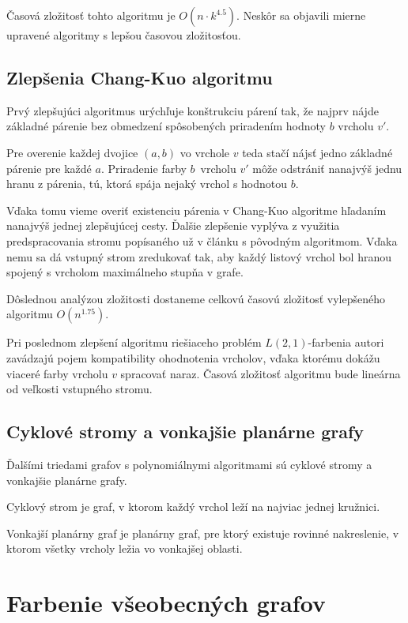 Časová zložitosť tohto algoritmu je $O(n \cdot k^{4.5})$\cite{chang_kuo}. Neskôr sa objavili
mierne upravené algoritmy s lepšou časovou zložitosťou.

\subsection{Zlepšenia Chang-Kuo algoritmu}

Prvý zlepšujúci algoritmus urýchľuje konštrukciu
párení tak, že najprv nájde základné párenie bez obmedzení spôsobených priradením hodnoty $b$
vrcholu $v'$.

Pre overenie každej dvojice $(a,b)$ vo vrchole $v$ teda stačí nájsť jedno základné
párenie pre každé $a$. Priradenie farby $b$ vrcholu $v'$ môže odstrániť nanajvýš jednu hranu z párenia,
tú, ktorá spája nejaký vrchol s hodnotou $b$. 

Vďaka tomu vieme overiť existenciu párenia v Chang-Kuo algoritme hľadaním nanajvýš
jednej zlepšujúcej cesty. Ďalšie zlepšenie vyplýva z využitia predspracovania stromu popísaného
už v článku s pôvodným algoritmom. Vďaka nemu sa dá vstupný strom zredukovať tak, aby každý
listový vrchol bol hranou spojený s vrcholom maximálneho stupňa v grafe\cite{chang_kuo}.

Dôslednou analýzou 
zložitosti dostaneme celkovú časovú zložitosť vylepšeného algoritmu $O(n^{1.75})$\cite{chang_kuo_improv}.

Pri poslednom zlepšení algoritmu riešiaceho problém $L(2,1)$-farbenia autori zavádzajú
pojem kompatibility ohodnotenia vrcholov, vďaka ktorému dokážu viaceré farby vrcholu $v$
spracovať naraz. Časová zložitosť algoritmu bude lineárna od veľkosti vstupného stromu\cite{chang_kuo_linear}.

\subsection{Cyklové stromy a vonkajšie planárne grafy}

Ďalšími triedami grafov s polynomiálnymi algoritmami sú cyklové stromy\cite{kaktusy} a vonkajšie
planárne grafy\cite{outer_planar}.

\begin{defn}
    Cyklový strom je graf, v ktorom každý vrchol leží na najviac jednej kružnici.
\end{defn}

\begin{defn}
    Vonkajší planárny graf je planárny graf, pre ktorý existuje rovinné nakreslenie, v ktorom
    všetky vrcholy ležia vo vonkajšej oblasti.
\end{defn}

\section{Farbenie všeobecných grafov}

